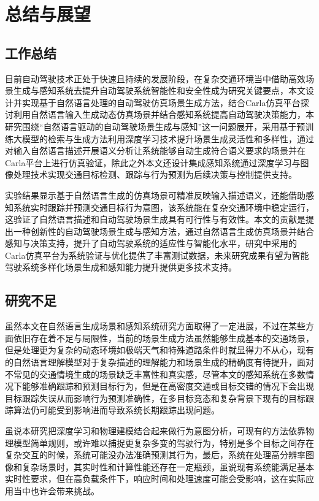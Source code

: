 \chapter{总结与展望}

\section{工作总结}

目前自动驾驶技术正处于快速且持续的发展阶段，在复杂交通环境当中借助高效场景生成与感知系统去提升自动驾驶系统智能性和安全性成为研究关键要点，本文设计并实现基于自然语言处理的自动驾驶仿真场景生成方法，结合Carla仿真平台探讨利用自然语言输入生成动态仿真场景并结合感知系统提高自动驾驶决策能力，本研究围绕“自然语言驱动的自动驾驶场景生成与感知”这一问题展开，采用基于预训练大模型的检索与生成方法利用深度学习技术提升场景生成灵活性和多样性，通过对输入自然语言描述开展语义分析让系统能够自动生成符合语义要求的场景并在Carla平台上进行仿真验证，除此之外本文还设计集成感知系统通过深度学习与图像处理技术实现交通目标检测、跟踪与行为预测为后续决策与控制提供支持。

实验结果显示基于自然语言生成的仿真场景可精准反映输入描述语义，还能借助感知系统实时跟踪并预测交通目标行为意图，该系统能在复杂交通环境中稳定运行，这验证了自然语言描述和自动驾驶场景生成具有可行性与有效性。本文的贡献是提出一种创新性的自动驾驶场景生成与感知方法，通过自然语言生成仿真场景并结合感知与决策支持，提升了自动驾驶系统的适应性与智能化水平，研究中采用的Carla仿真平台为系统验证与优化提供了丰富测试数据，未来研究成果有望为智能驾驶系统多样化场景生成和感知能力提升提供更多技术支持。

\section{研究不足}
虽然本文在自然语言生成场景和感知系统研究方面取得了一定进展，不过在某些方面依旧存在着不足与局限性，当前的场景生成方法虽然能够生成基本的交通场景，但是处理更为复杂的动态环境如极端天气和特殊道路条件时就显得力不从心，现有的自然语言理解模型对于复杂描述的理解能力和场景生成的精确度有待提升，面对不常见的交通情境生成的场景缺乏丰富性和真实感，尽管本文的感知系统在多数情况下能够准确跟踪和预测目标行为，但是在高密度交通或目标交错的情况下会出现目标跟踪失误从而影响行为预测准确性，在多目标竞态和复杂背景下现有的目标跟踪算法仍可能受到影响进而导致系统长期跟踪出现问题。


虽说本研究把深度学习和物理建模结合起来做行为意图分析，可现有的方法依靠物理模型简单规则，或许难以捕捉更复杂多变的驾驶行为，特别是多个目标之间存在复杂交互的时候，系统可能没办法准确预测其行为，最后，系统在处理高分辨率图像和复杂场景时，其实时性和计算性能还存在一定瓶颈，虽说现有系统能满足基本实时性要求，但在高负载条件下，响应时间和处理速度可能会受影响，这在实际应用当中也许会带来挑战。


